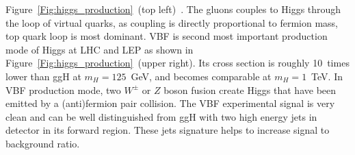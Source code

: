 Figure~\ref{Fig:higgs_production}~(top left)~\cite{Referenceb}. 
The gluons couples to Higgs through the loop of virtual 
quarks, as coupling is directly proportional to fermion mass, top quark loop is most dominant. 
VBF is second most important production mode of Higgs at LHC and LEP as shown in 
Figure~\ref{Fig:higgs_production}~(upper right). Its cross section is roughly 10~times lower than ggH at
$m_H = 125$~GeV, and becomes comparable at $m_H = 1$~TeV. 
In VBF production mode, two $W^\pm$ or $Z$ boson fusion create 
Higgs that have been emitted by a (anti)fermion pair collision. The VBF experimental signal is very clean and can be well distinguished from ggH with
two high energy jets in detector in its forward region. These jets signature helps to increase signal to background ratio. 


